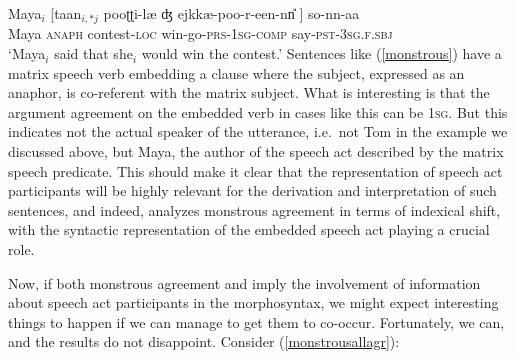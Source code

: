 \documentclass[output=paper, modfonts, nonflat]{langsci/langscibook}
\begin{document}
\ea
  \label{monstrous}\gll Maya$_i$ [taan$_{i,*j}$ pooʈʈi-læ{} ʤ
  ejkkæ-poo-r-een-nn\U{} ] so-nn-aa\\
  Maya \textsc{anaph} contest-\textsc{loc}{}
  win-go-\textsc{prs}-\textsc{1sg}-\textsc{comp}{}
  {} say-\textsc{pst}-\textsc{3sg.f}.\textsc{sbj}\\
  \glt `Maya$_i$ said that she$_i$ would win the contest.'
\z 
%
Sentences like (\ref{monstrous}) have a matrix speech verb embedding a
clause where the subject, expressed as an anaphor, is co-referent with
the matrix subject.  What is interesting is that the argument
agreement on the embedded verb in cases like this can be
\textsc{1sg}. But this indicates not the actual speaker of the
utterance, i.e.\ not Tom in the example we discussed above, but Maya,
the author of the speech act described by the matrix speech
predicate. This should make it clear that the representation of speech
act participants will be highly relevant for the derivation and
interpretation of such sentences, and indeed, \citet{sundaresan:diss}
analyzes monstrous agreement in terms of indexical shift, with the
syntactic representation of the embedded speech act playing a crucial
role.

Now, if both monstrous agreement and \allagr{} imply the involvement
of information about speech act participants in the morphosyntax, we
might expect interesting things to happen if we can manage to get them
to co-occur. Fortunately, we can, and the results do not
disappoint. Consider (\ref{monstrousallagr}):
\end{document}
